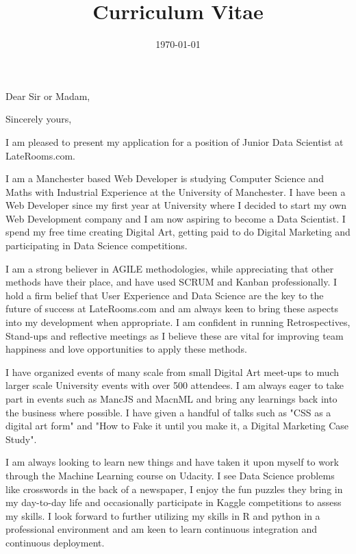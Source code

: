 \documentclass[11pt,a4paper,sans]{moderncv} %
\title{Curriculum Vitae}
\begin{document}


\clearpage

\date{\today} %
\opening{Dear Sir or Madam,} %
\closing{Sincerely yours,} %

\makelettertitle %

I am pleased to present my application for a position of Junior Data Scientist at LateRooms.com.

I am a Manchester based Web Developer is studying Computer Science and Maths with Industrial Experience at the University of Manchester. I have been a Web Developer since my first year at University where I decided to start my own Web Development company and I am now aspiring to become a Data Scientist. I spend my free time creating Digital Art, getting paid to do Digital Marketing and participating in Data Science competitions.

I am a strong believer in AGILE methodologies, while appreciating that other methods have their place, and have used SCRUM and Kanban professionally. I hold a firm belief that User Experience and Data Science are the key to the future of success at LateRooms.com and am always keen to bring these aspects into my development when appropriate. I am confident in running Retrospectives, Stand-ups and reflective meetings as I believe these are vital for improving team happiness and love opportunities to apply these methods.

I have organized events of many scale from small Digital Art meet-ups to much larger scale University events with over 500 attendees. I am always eager to take part in events such as MancJS and MacnML and bring any learnings back into the business where possible. I have given a handful of talks such as "CSS as a digital art form" and "How to Fake it until you make it, a Digital Marketing Case Study".

I am always looking to learn new things and have taken it upon myself to work through the Machine Learning course on Udacity. I see Data Science problems like crosswords in the back of a newspaper, I enjoy the fun puzzles they bring in my day-to-day life and occasionally participate in Kaggle competitions to assess my skills. I look forward to further utilizing my skills in R and python in a professional environment and am keen to learn continuous integration and continuous deployment.
\end{document}
